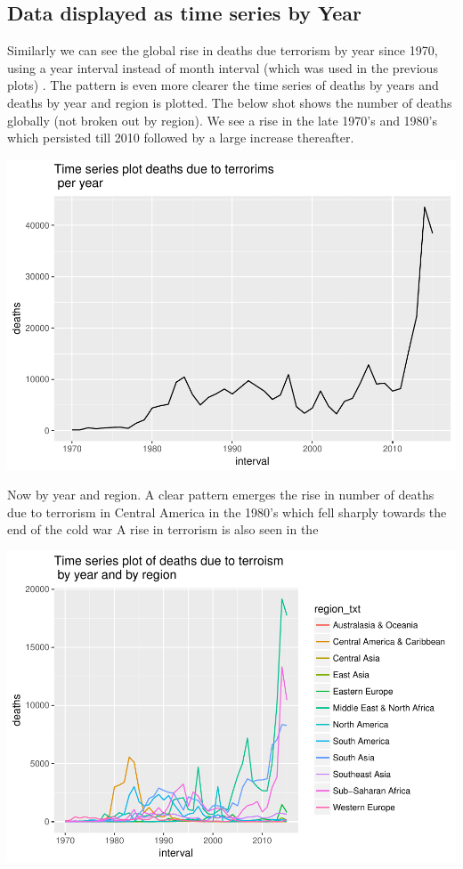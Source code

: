 \documentclass[]{article}
\begin{document}
\subsection{Data displayed as time series by
Year}\label{data-displayed-as-time-series-by-year}

Similarly we can see the global rise in deaths due terrorism by year
since 1970, using a year interval instead of month interval (which was
used in the previous plots) . The pattern is even more clearer the time
series of deaths by years and deaths by year and region is plotted. The
below shot shows the number of deaths globally (not broken out by
region). We see a rise in the late 1970's and 1980's which persisted
till 2010 followed by a large increase thereafter.

\includegraphics{Peters_experiment_markdown_files/figure-latex/unnamed-chunk-4-1.pdf}

Now by year and region. A clear pattern emerges the rise in number of
deaths due to terrorism in Central America in the 1980's which fell
sharply towards the end of the cold war A rise in terrorism is also seen
in the

\includegraphics{Peters_experiment_markdown_files/figure-latex/unnamed-chunk-5-1.pdf}
\end{document}
